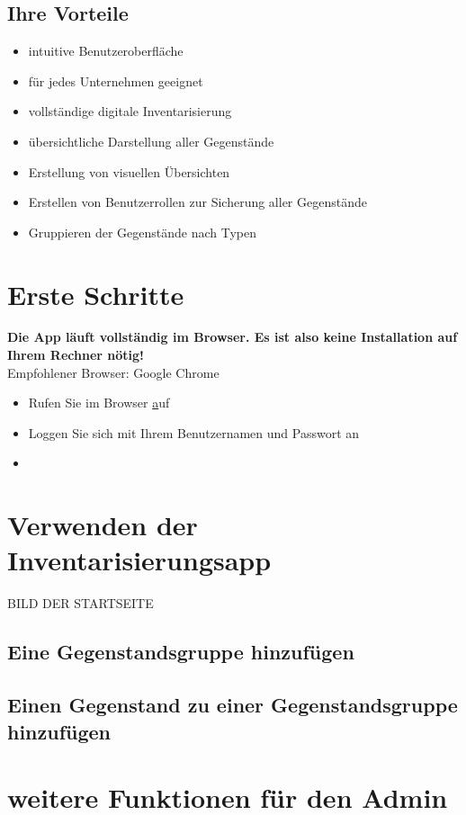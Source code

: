 \documentclass[11pt,a4paper]{report}
\begin{document}
	\subsection{Ihre Vorteile}
	\begin{itemize}
		\item intuitive Benutzeroberfläche
		\item für jedes Unternehmen geeignet
		\item vollständige digitale Inventarisierung
		\item übersichtliche Darstellung aller Gegenstände
		\item Erstellung von visuellen Übersichten
		\item Erstellen von Benutzerrollen zur Sicherung aller Gegenstände
		\item Gruppieren der Gegenstände nach Typen
	\end{itemize}
	\section{Erste Schritte}
	\textbf{Die App läuft vollständig im Browser. Es ist also keine Installation auf Ihrem Rechner nötig!}\\
	Empfohlener Browser: Google Chrome
	
	\begin{itemize}
		\item Rufen Sie im Browser \href{http://UNSEREADRESSE.de } auf
		\item Loggen Sie sich mit Ihrem Benutzernamen und Passwort an
		\item 
	\end{itemize}
	
	\section{Verwenden der Inventarisierungsapp}
	BILD DER STARTSEITE
	\subsection{Eine Gegenstandsgruppe hinzufügen}
	
	\subsection{Einen Gegenstand zu einer Gegenstandsgruppe hinzufügen}
	
	\section{weitere Funktionen für den Admin}
\end{document}
